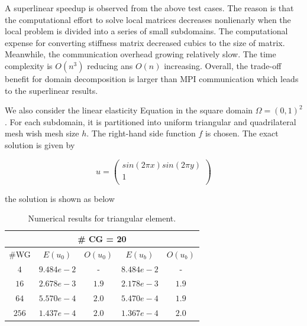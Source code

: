    A superlinear speedup is observed from the above test cases. The reason is that the computational effort to solve local matrices decreases nonlienarly when the local problem is divided into a series of small subdomains. The computational expense for converting stiffness matrix decreased cubics to the size of matrix. Meanwhile, the communication overhead growing relatively slow. The time complexity is $ O(n^{3}) $ reducing ans $ O(n) $ increasing. Overall, the trade-off benefit for domain decomposition is larger than MPI communication which leads to the superlinear results.
   
   We also consider the linear elasticity Equation in the square domain $ \Omega = (0, 1)^2 $. For each subdomain, it is partitioned into uniform triangular and quadrilateral mesh wish mesh size $ h $. The right-hand side function $ f $ is chosen. The exact solution is given by
   
  \begin{equation}
  u = \begin{pmatrix}
  sin(2 \pi x) sin(2\pi y) \\ 1\\
  \end{pmatrix}
  \end{equation}
  
  the solution is shown as below
  
   \begin{table}[h]
   	\setlength{\tabcolsep}{2pt} {
   		\caption{ Numerical results for triangular element.}
   		\label{Tab:hwgcg l1}
   		\vspace{-5pt}
   		\begin{center}
   			\begin{tabular}{c|c|c|c|c}
   				\hline
   				\multicolumn{5}{c}{\# CG = 20} \\
   				\hline
   				\#WG & $ E (u_{0}) $ & $ O(u_{0}) $ & $ E(u_{b})  $& $ O(u_{b})  $\\
   				\hline
   				$ 4 $ & $ 9.484e-2 $ & - & $ 8.484e-2 $ & - \\
   				\hline
   				$ 16 $ & $ 2.678e-3 $ & $ 1.9 $& $ 2.178e-3 $ & $ 1.9 $ \\
   				\hline
   				$ 64 $ & $ 5.570e-4 $ & $ 2.0 $ & $ 5.470e-4 $ & $ 1.9 $ \\
   				\hline
   				$ 256 $ & $ 1.437e-4 $ & $ 2.0 $ & $ 1.367e-4 $ & $ 2.0 $\\
   				\hline
   			\end{tabular}
   		\end{center} }
   	\end{table}
   	
